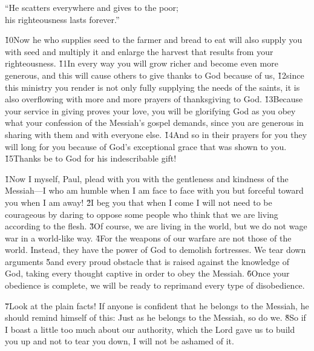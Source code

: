 \begin{poetry}
\poeml ``He scatters everywhere and gives to the poor; \\
\poemll    his righteousness lasts forever.''
\end{poetry}

\v{10}Now he who supplies seed to the farmer and bread to eat will also supply you with seed and multiply it and enlarge the harvest that results from your righteousness. \v{11}In every way you will grow richer and become even more generous, and this will cause others to give thanks to God because of us, \v{12}since this ministry you render is not only fully supplying the needs of the saints, it is also overflowing with more and more prayers of thanksgiving to God. \v{13}Because your service in giving proves your love, you will be glorifying God as you obey what your confession of the Messiah's gospel demands, since you are generous in sharing with them and with everyone else. \v{14}And so in their prayers for you they will long for you because of God's exceptional grace that was shown to you. \v{15}Thanks be to God for his indescribable gift!

\v{1}Now I myself, Paul, plead with you with the gentleness and kindness of the Messiah---I who am humble when I am face to face with you but forceful toward you when I am away! \v{2}I beg you that when I come I will not need to be courageous by daring to oppose some people who think that we are living according to the flesh. \v{3}Of course, we are living in the world, but we do not wage war in a world-like way. \v{4}For the weapons of our warfare are not those of the world. Instead, they have the power of God to demolish fortresses. We tear down arguments \v{5}and every proud obstacle that is raised against the knowledge of God, taking every thought captive in order to obey the Messiah. \v{6}Once your obedience is complete, we will be ready to reprimand every type of disobedience.

\v{7}Look at the plain facts! If anyone is confident that he belongs to the Messiah, he should remind himself of this: Just as he belongs to the Messiah, so do we. \v{8}So if I boast a little too much about our authority, which the Lord gave us to build you up and not to tear you down, I will not be ashamed of it.

